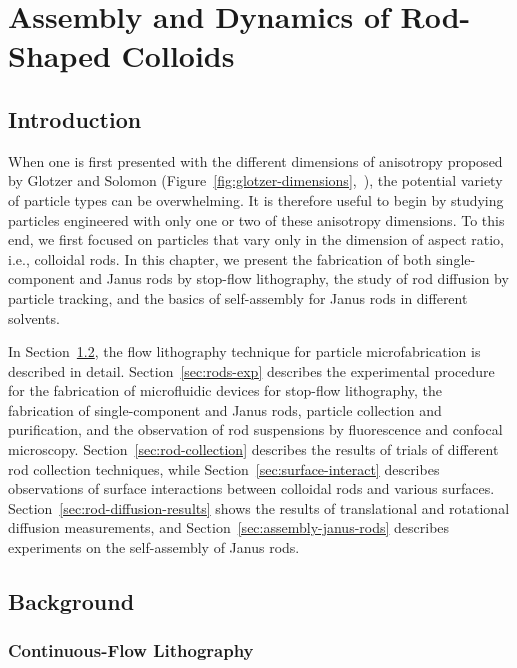 \chapter{Assembly and Dynamics of Rod-Shaped Colloids}
\label{ch:rods}
\section{Introduction}

When one is first presented with the different dimensions of anisotropy proposed by 
Glotzer and Solomon (Figure~\ref{fig:glotzer-dimensions},~\cite{glotzer-solomon}), the
potential variety of particle types can be overwhelming. It is therefore useful to begin by studying 
particles engineered with only one or two of these anisotropy dimensions. To this end, we first
focused on particles that vary only in the dimension of 
aspect ratio, i.e., colloidal rods. In this chapter, we present the fabrication of both single-component and 
Janus rods by stop-flow lithography, the study of rod diffusion by particle tracking, and the basics
of self-assembly for Janus rods in different solvents.

In Section~\ref{sec:rods-background}, the flow lithography technique for particle microfabrication
is described in detail. Section~\ref{sec:rods-exp} describes the experimental procedure for 
the fabrication of microfluidic devices for stop-flow
lithography, the fabrication of single-component and Janus rods,
particle collection and purification,
and the observation of rod suspensions by fluorescence and confocal microscopy. 
Section~\ref{sec:rod-collection} describes the results of trials of different rod collection
techniques, while Section~\ref{sec:surface-interact} describes observations of 
surface interactions between colloidal rods and various surfaces. Section~\ref{sec:rod-diffusion-results}
shows the results of translational and rotational diffusion measurements, and 
Section~\ref{sec:assembly-janus-rods} describes experiments on the 
self-assembly of Janus rods.

\section{Background}
\label{sec:rods-background}

\subsection{Continuous-Flow Lithography}

